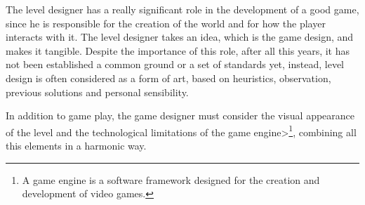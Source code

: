 \par

The level designer has a really significant role in the development of a good game, since he is responsible for the creation of the world and for how the player interacts with it. The level designer takes an idea, which is the game design, and makes it tangible.
Despite the importance of this role, after all this years, it has not been established a common ground or a set of standards yet, instead, level design is often considered as a form of art, based on heuristics, observation, previous solutions and personal sensibility.

\par

In addition to game play, the game designer must consider the visual appearance of the level and the technological limitations of the \<game engine>\footnote{\label{gameEngineFootnote}A game engine is a software framework designed for the creation and development of video games.}, combining all this elements in a harmonic way.

\par

